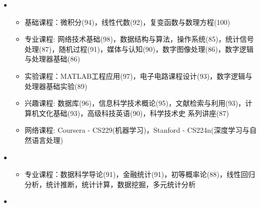   \begin{itemize}[leftmargin=*]
    \item
      {\small
      \begin{itemize}
        \item{基础课程：微积分(94)，线性代数(92)，复变函数与数理方程(100)}

        \item{专业课程: 网络技术基础(98)，数据结构与算法，操作系统(85)，统计信号处理(87)，随机过程(91)，媒体与认知(90)，数字图像处理(86)，数字逻辑与处理器基础(86)}

        \item{实验课程：MATLAB工程应用(97)，电子电路课程设计(93)，数字逻辑与处理器基础实验(89)}

        \item{兴趣课程: 数据库(96)，信息科学技术概论(95)，文献检索与利用(93)，计算机文化基础(93)，高级科技英语(90)，科学技术史 系列讲座(87)}
        
        \item{网络课程: Coursera - CS229(机器学习)，Stanford - CS224n(深度学习与自然语言处理)}
      \end{itemize}
      }
    \item
      {\small
      \begin{itemize}
        \item{专业课程：数据科学导论(91)，金融统计(91)，初等概率论(88)，线性回归分析，统计推断，统计计算，数据挖掘，多元统计分析}
      \end{itemize}
      }
    \item
    
    ~\\
  \end{itemize}